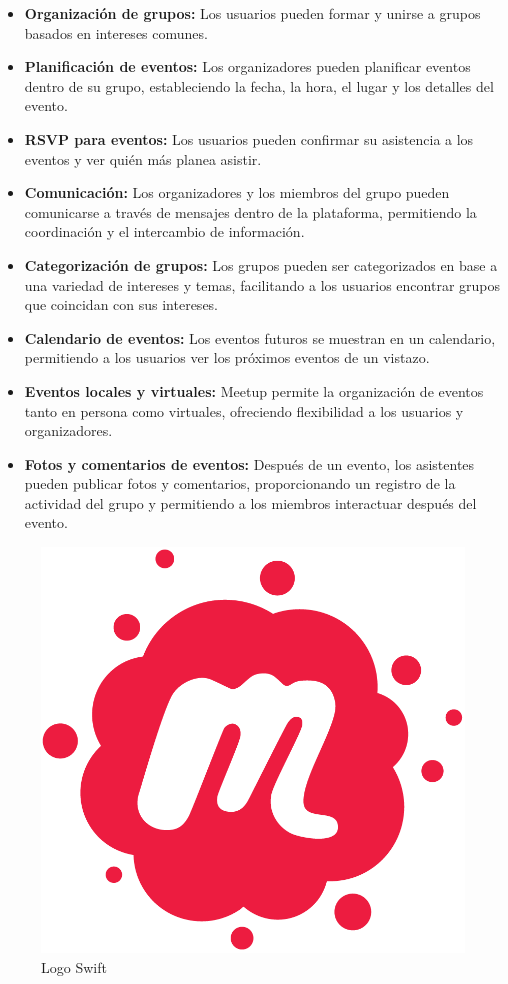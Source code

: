 \begin{itemize}
  \item \textbf{Organización de grupos:} Los usuarios pueden formar y unirse a grupos basados en intereses comunes.
  \item \textbf{Planificación de eventos:} Los organizadores pueden planificar eventos dentro de su grupo, estableciendo la fecha, la hora, el lugar y los detalles del evento.
  \item \textbf{RSVP para eventos:} Los usuarios pueden confirmar su asistencia a los eventos y ver quién más planea asistir.
  \item \textbf{Comunicación:} Los organizadores y los miembros del grupo pueden comunicarse a través de mensajes dentro de la plataforma, permitiendo la coordinación y el intercambio de información.
  \item \textbf{Categorización de grupos:} Los grupos pueden ser categorizados en base a una variedad de intereses y temas, facilitando a los usuarios encontrar grupos que coincidan con sus intereses.
  \item \textbf{Calendario de eventos:} Los eventos futuros se muestran en un calendario, permitiendo a los usuarios ver los próximos eventos de un vistazo.
  \item \textbf{Eventos locales y virtuales:} Meetup permite la organización de eventos tanto en persona como virtuales, ofreciendo flexibilidad a los usuarios y organizadores.
  \item \textbf{Fotos y comentarios de eventos:} Después de un evento, los asistentes pueden publicar fotos y comentarios, proporcionando un registro de la actividad del grupo y permitiendo a los miembros interactuar después del evento.
\end{itemize}
\begin{figure}[H]
        \centering
        \includegraphics[width=.5\linewidth]{images/Meetup_Logo.png}
        \caption{Logo Swift}
        \label{fig:my_label}
    \end{figure}

